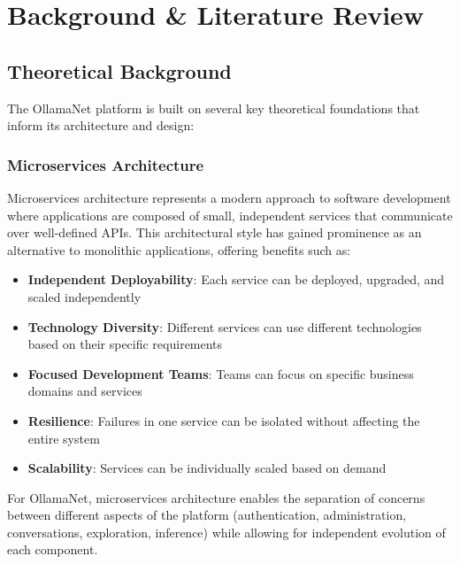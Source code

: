 \def\chapdir{./Chapter02}

\chapter{Background \& Literature Review} \label{ch:background}

\section{Theoretical Background}

The OllamaNet platform is built on several key theoretical foundations that inform its architecture and design:

\subsection{Microservices Architecture}

Microservices architecture represents a modern approach to software development where applications are composed of small, independent services that communicate over well-defined APIs. This architectural style has gained prominence as an alternative to monolithic applications, offering benefits such as:

\begin{itemize}
    \item \textbf{Independent Deployability}: Each service can be deployed, upgraded, and scaled independently
    \item \textbf{Technology Diversity}: Different services can use different technologies based on their specific requirements
    \item \textbf{Focused Development Teams}: Teams can focus on specific business domains and services
    \item \textbf{Resilience}: Failures in one service can be isolated without affecting the entire system
    \item \textbf{Scalability}: Services can be individually scaled based on demand
\end{itemize}

For OllamaNet, microservices architecture enables the separation of concerns between different aspects of the platform (authentication, administration, conversations, exploration, inference) while allowing for independent evolution of each component.

